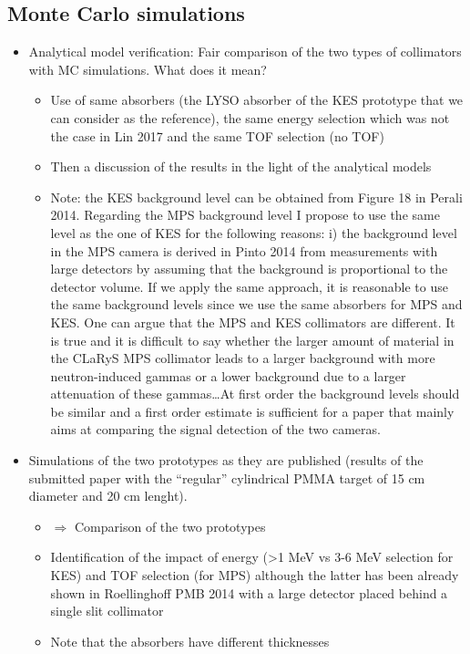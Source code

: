 \documentclass[a4paper,english]{article}
\begin{document}
\subsection{Monte Carlo simulations}\label{sec:MC}

\begin{itemize}
  \item Analytical model verification: Fair comparison of the two types of collimators with MC simulations. What does it mean? 
  \begin{itemize}
    \item Use of same absorbers (the LYSO absorber of the KES prototype that we can consider as the reference), the same energy selection which was not the case in Lin 2017 and the same TOF selection (no TOF)
    \item Then a discussion of the results in the light of the analytical models
    \item Note: the KES background level can be obtained from Figure 18 in Perali 2014. Regarding the MPS background level I propose to use the same level as the one of KES for the following reasons: i) the background level in the MPS camera is derived in Pinto 2014 from measurements with large detectors by assuming that the background is proportional to the detector volume. If we apply the same approach, it is reasonable to use the same background levels since we use the same absorbers for MPS and KES. One can argue that the MPS and KES collimators are different. It is true and it is difficult to say whether the larger amount of material in the CLaRyS MPS collimator leads to a larger background with more neutron-induced gammas or a lower background due to a larger attenuation of these gammas\dots At first order the background levels should be similar and a first order estimate is sufficient for a paper that mainly aims at comparing the signal detection of the two cameras.
  \end{itemize}    
  \item Simulations of the two prototypes as they are published (results of the submitted paper with the \enquote{regular} cylindrical PMMA target of 15 cm diameter and 20 cm lenght). 
  \begin{itemize}
    \item $\Rightarrow$ Comparison of the two prototypes
    \item Identification of the impact of energy (>1 MeV vs 3-6 MeV selection for KES) and TOF selection (for MPS) although the latter has been already shown in Roellinghoff PMB 2014 with a large detector placed behind a single slit collimator
    \item Note that the absorbers have different thicknesses
  \end{itemize}     
\end{itemize}
\end{document}
